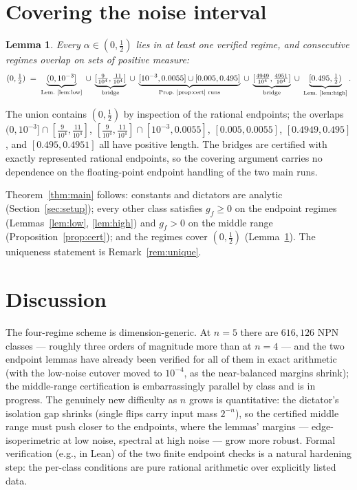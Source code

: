 \documentclass[12pt,draftclsnofoot,onecolumn,journal]{IEEEtran}
\newtheorem{lemma}{Lemma}
\begin{document}
\section{Covering the noise interval}

\begin{lemma}\label{lem:cover}
Every $\alpha\in(0,\tfrac12)$ lies in at least one verified regime, and
consecutive regimes overlap on sets of positive measure:
\[
(0,\tfrac12)\;=\;
\underbrace{(0,10^{-3}]}_{\text{Lem.~\ref{lem:low}}}
\;\cup\;\underbrace{[\tfrac{9}{10^4},\tfrac{11}{10^4}]}_{\text{bridge}}
\;\cup\;\underbrace{[10^{-3},0.0055]\cup[0.005,0.495]}_{\text{Prop.~\ref{prop:cert} runs}}
\;\cup\;\underbrace{[\tfrac{4949}{10^4},\tfrac{4951}{10^4}]}_{\text{bridge}}
\;\cup\;\underbrace{[0.495,\tfrac12)}_{\text{Lem.~\ref{lem:high}}}.
\]
\end{lemma}

\begin{IEEEproof}
The union contains $(0,\tfrac12)$ by inspection of the rational endpoints;
the overlaps $(0,10^{-3}]\cap[\tfrac9{10^4},\tfrac{11}{10^4}]$,
$[\tfrac9{10^4},\tfrac{11}{10^4}]\cap[10^{-3},0.0055]$, $[0.005,0.0055]$,
$[0.4949,0.495]$, and $[0.495,0.4951]$ all have positive length. The bridges
are certified with exactly represented rational endpoints, so the covering
argument carries no dependence on the floating-point endpoint handling of
the two main runs.
\end{IEEEproof}

Theorem~\ref{thm:main} follows: constants and dictators are analytic
(Section~\ref{sec:setup}); every other class satisfies $g_f\ge0$ on the
endpoint regimes (Lemmas~\ref{lem:low}, \ref{lem:high}) and $g_f>0$ on the
middle range (Proposition~\ref{prop:cert}); and the regimes cover
$(0,\tfrac12)$ (Lemma~\ref{lem:cover}). The uniqueness statement is
Remark~\ref{rem:unique}.

\section{Discussion}\label{sec:discussion}

The four-regime scheme is dimension-generic. At $n=5$ there are $616{,}126$
NPN classes --- roughly three orders of magnitude more than at $n=4$ --- and
the two endpoint lemmas have already been verified for all of them in exact
arithmetic (with the low-noise cutover moved to $10^{-4}$, as the
near-balanced margins shrink); the middle-range certification is
embarrassingly parallel by class and is in progress. The genuinely new
difficulty as $n$ grows is quantitative: the dictator's isolation gap
shrinks (single flips carry input mass $2^{-n}$), so the certified middle
range must push closer to the endpoints, where the lemmas' margins ---
edge-isoperimetric at low noise, spectral at high noise --- grow more
robust. Formal verification (e.g., in Lean) of the two finite endpoint
checks is a natural hardening step: the per-class conditions are pure
rational arithmetic over explicitly listed data.
\end{document}
